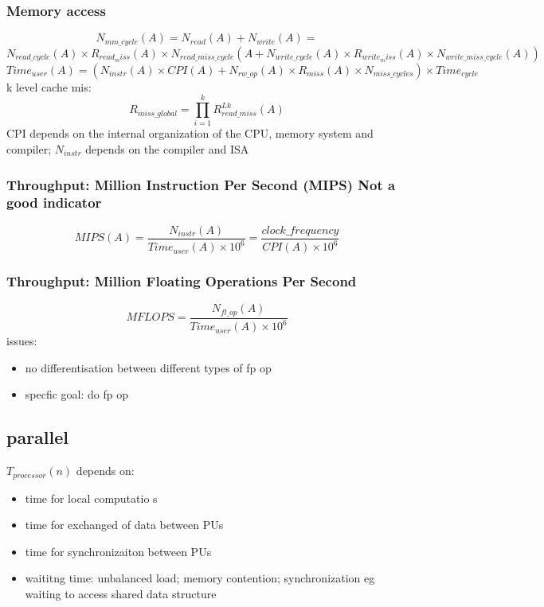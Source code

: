 \documentclass{article}
\begin{document}
\subsubsection*{Memory access}
\[ N_{mm\_cycle}(A) = N_{read}(A) + N_{write}(A) = \]\[N_{read\_cycle}(A) \times R_{read_miss}(A) \times N_{read\_miss\_cycle}(A + 
N_{write\_cycle}(A) \times R_{write_miss}(A) \times N_{write\_miss\_cycle}(A))\]
\[Time_{user}(A) = (N_{instr}(A) \times CPI(A) + N_{rw\_op}(A) \times R_{miss}(A) \times N_{miss\_cycles})\times Time_{cycle}\]
k level cache mis:
\[R_{miss\_global} = \prod_{i=1}^{k} R^{Lk}_{read\_miss}(A)\]
CPI depends on the internal organization of the CPU, memory system and compiler; $N_{instr}$ depends on the compiler and ISA\\
\subsubsection*{Throughput: Million Instruction Per Second (MIPS) Not a good indicator}
\[MIPS(A) = \frac{N_{instr}(A)}{Time_{user}(A) \times 10^6} = \frac{clock\_frequency}{CPI(A) \times 10^6}\]
\subsubsection*{Throughput: Million Floating Operations Per Second}
\[MFLOPS = \frac{N_{fl\_op}(A)}{Time_{user}(A) \times 10^6}\]
issues: 
\begin{itemize}
    \item no differentisation between different types of fp op 
    \item specfic goal: do fp op
\end{itemize}
\subsection{parallel}
$T_{processor}(n)$ depends on:
\begin{itemize}
    \item time for local computatio s
    \item time for exchanged of data between PUs
    \item time for synchronizaiton between PUs
    \item waititng time: unbalanced load; memory contention; synchronization eg waiting to access shared data structure
\end{itemize}
\end{document}
